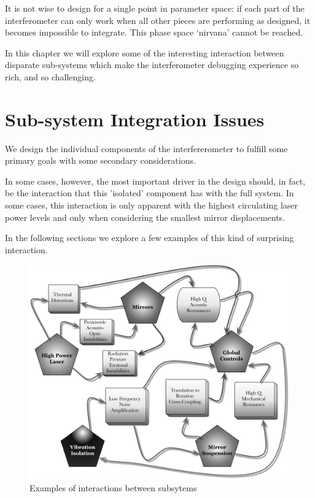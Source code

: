 It is not wise to design for a single point in parameter space: if each
part of the interferometer can only work when all other pieces are
performing as designed, it becomes impossible to integrate. This phase
space `nirvana' cannot be reached.

In this chapter we will explore some of the interesting interaction between
disparate sub-systems which make the interferometer debugging experience
so rich, and so challenging.


\section{Sub-system Integration Issues}
We design the individual components of the interfererometer to fulfill some
primary goals with some secondary considerations.

In some cases, however, the most important driver in the design should, in fact, be the interaction that this 'isolated' component has with the full system. In some cases, this interaction is only apparent with the highest circulating laser power levels and only when considering the smallest mirror displacements.

In the following sections we explore a few examples of this kind of surprising
interaction.


\begin{figure}[h]
\centering
\includegraphics[width=\columnwidth]{Figures/SystemConflicts-BW.pdf}
\caption{Examples of interactions between subsytems}
\label{fig:SystemConflicts}
\end{figure}

